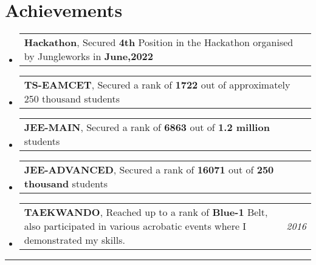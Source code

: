 \documentclass[a4paper,11pt]{article}
\makeatletter
\newcommand{\resumePOR}[3]{
\vspace{0.5mm}\item
    \begin{tabular*}{0.97\textwidth}[t]{l@{\extracolsep{\fill}}r}
        \textbf{#1},\hspace{0.3mm}#2 & \textit{\small{#3}} 
    \end{tabular*}
    \vspace{-2mm}
}
\newcommand{\resumeSubHeadingListStart}{\begin{itemize}[leftmargin=*,labelsep=0mm]}
\newcommand{\resumeSubHeadingListEnd}{\end{itemize}\vspace{2mm}}
\makeatother
\begin{document}
\section{\textbf{Achievements}}
\vspace{-0.1mm}
\resumeSubHeadingListStart
  \resumePOR
    {Hackathon} %
    { Secured \textbf{4th} Position in the Hackathon organised by Jungleworks in \textbf{June,2022} } %
    {} %
  \vspace{-0.1mm}
  \resumePOR
    {TS-EAMCET} %
    { Secured a rank of \textbf{1722} out of approximately 250 thousand students } %
    {} %
  \resumePOR
    {JEE-MAIN} %
    { Secured a rank of \textbf{6863} out of \textbf{1.2 million} students} %
    {} %
  \vspace{-0.1mm}
  \resumePOR
    {JEE-ADVANCED} %
    { Secured a rank of \textbf{16071} out of \textbf{250 thousand} students } %
    {} %
  \vspace{-0.1mm}
  \resumePOR
    {TAEKWANDO} %
    { Reached up to a rank of \textbf{Blue-1} Belt, also participated in various acrobatic events where I demonstrated my skills.} %
    {2016} %
  \vspace{-1.2mm}
\resumeSubHeadingListEnd

\hspace*{-5mm}\rule{1.035\textwidth}{0.1mm}
\end{document}
